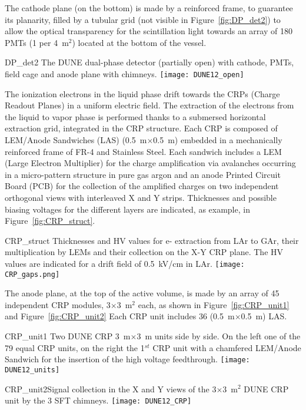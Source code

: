  The cathode plane (on the bottom) is made by a reinforced frame, to
guarantee its planarity, filled by a tubular grid (not visible in
Figure~\ref{fig:DP_det2}) to allow the optical transparency for the
scintillation light towards an array of 180 PMTs (1 per 4~m$^2$)
located at the bottom of the vessel.
\begin{cdrfigure}{DP_det2}
{The DUNE dual-phase detector (partially open) with cathode, PMTs, field cage and anode plane with chimneys.}
\texttt{[image: DUNE12\_open]}
\end{cdrfigure}

The ionization electrons in the liquid phase drift towards the CRPs
(Charge Readout Planes) in a uniform electric field. The extraction of
the electrons from the liquid to vapor phase is performed thanks to a
submersed horizontal extraction grid, integrated in the CRP structure.
Each CRP is composed of LEM/Anode Sandwiches (LAS) (0.5~m$\times$0.5~m)
embedded in a mechanically reinforced frame of FR-4 and Stainless
Steel.  Each sandwich includes a LEM (Large Electron Multiplier) for
the charge amplification via avalanches occurring in a micro-pattern
structure in pure gas argon and an anode Printed Circuit Board (PCB)
for the collection of the amplified charges on two independent
orthogonal views with interleaved X and Y strips.  Thicknesses and
possible biasing voltages for the different layers are indicated, as
example, in Figure~\ref{fig:CRP_struct}.

\begin{cdrfigure}{CRP_struct}
{Thicknesses and HV values for e- extraction from LAr to GAr, their 
multiplication by LEMs and their collection on the X-Y CRP plane. The 
HV values are indicated for a drift field of 0.5~kV/cm in LAr.}
\texttt{[image: CRP\_gaps.png]}
\end{cdrfigure}

The anode plane, at the top of the active volume, is made by an array
of 45 independent CRP modules, 3$\times$3~m$^2$ each, as shown in
Figure~\ref{fig:CRP_unit1} and Figure~\ref{fig:CRP_unit2} Each CRP
unit includes 36 (0.5~m$\times$0.5~m) LAS.
\begin{cdrfigure}{CRP_unit1}
{Two DUNE CRP 3~m$\times$3~m units side by side. On the left one of the 79 equal 
CRP units, on the right the 1$^{st}$ CRP unit with a chamfered LEM/Anode Sandwich 
for the insertion of the high voltage feedthrough.}
\texttt{[image: DUNE12\_units]}
\end{cdrfigure}
\begin{cdrfigure}
{CRP_unit2}{Signal collection in the X and Y views of the  3$\times$3~m$^2$ DUNE CRP unit by the 3 SFT chimneys.}
\texttt{[image: DUNE12\_CRP]}
\end{cdrfigure}

